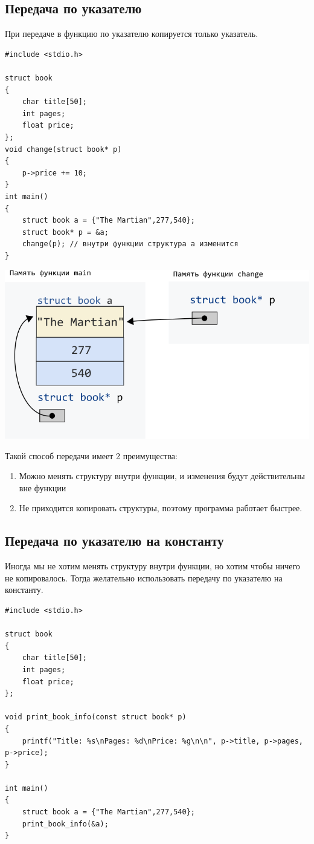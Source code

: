 \documentclass{article}
\begin{document}
\subsection*{Передача по указателю}
При передаче в функцию по указателю копируется только указатель.
\begin{lstlisting}
#include <stdio.h>

struct book 
{
    char title[50];
    int pages;
    float price;
};
void change(struct book* p) 
{
    p->price += 10;
}
int main() 
{
    struct book a = {"The Martian",277,540};
    struct book* p = &a;
    change(p); // внутри функции структура a изменится
}
\end{lstlisting}
\begin{center}
\includegraphics[scale=0.6]{../images/structpassbypointer.png}
\end{center}
Такой способ передачи имеет 2 преимущества:
\begin{enumerate}
\item Можно менять структуру внутри функции, и изменения будут действительны вне функции
\item Не приходится копировать структуры, поэтому программа работает быстрее.
\end{enumerate}

\subsection*{Передача по указателю на константу}
Иногда мы не хотим менять структуру внутри функции, но хотим чтобы ничего не копировалось. Тогда желательно использовать передачу по указателю
на константу.
\begin{lstlisting}
#include <stdio.h>

struct book 
{
    char title[50];
    int pages;
    float price;
};

void print_book_info(const struct book* p) 
{
    printf("Title: %s\nPages: %d\nPrice: %g\n\n", p->title, p->pages, p->price);
}

int main() 
{
    struct book a = {"The Martian",277,540};
    print_book_info(&a);
}
\end{lstlisting}
\newpage
\end{document}
